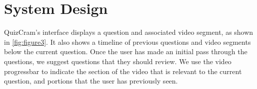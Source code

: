 \documentclass{chi-ext}
\begin{document}

\section{System Design}


QuizCram's interface displays a question and associated video segment, as shown in \autoref{fig:figure3}. It also shows a timeline of previous questions and video segments below the current question. Once the user has made an initial pass through the questions, we suggest questions that they should review. We use the video progressbar to indicate the section of the video that is relevant to the current question, and portions that the user has previously seen.
\end{document}
